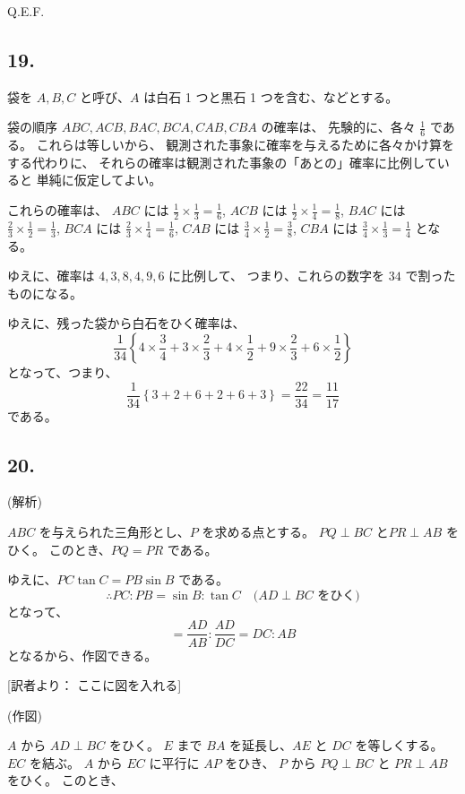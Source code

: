Q.E.F.

\subsection*{19.}

袋を $A, B, C$ と呼び、$A$ は白石 1 つと黒石 1 つを含む、などとする。

袋の順序 $ABC, ACB, BAC, BCA, CAB, CBA$ の確率は、
先験的に、各々 $\frac{1}{6}$ である。
これらは等しいから、
観測された事象に確率を与えるために各々かけ算をする代わりに、
それらの確率は観測された事象の「あとの」確率に比例していると
単純に仮定してよい。

これらの確率は、
$ABC$ には $\frac{1}{2} \times \frac{1}{3} = \frac{1}{6}$,
$ACB$ には $\frac{1}{2} \times \frac{1}{4} = \frac{1}{8}$,
$BAC$ には $\frac{2}{3} \times \frac{1}{2} = \frac{1}{3}$,
$BCA$ には $\frac{2}{3} \times \frac{1}{4} = \frac{1}{6}$,
$CAB$ には $\frac{3}{4} \times \frac{1}{2} = \frac{3}{8}$,
$CBA$ には $\frac{3}{4} \times \frac{1}{3} = \frac{1}{4}$
となる。

ゆえに、確率は $4, 3, 8, 4, 9, 6$ に比例して、
つまり、これらの数字を $34$ で割ったものになる。

ゆえに、残った袋から白石をひく確率は、
\[
\frac{1}{34} \left\{
    4 \times \frac{3}{4}
  + 3 \times \frac{2}{3}
  + 4 \times \frac{1}{2}
  + 9 \times \frac{2}{3}
  + 6 \times \frac{1}{2}
  \right\}
\]
となって、つまり、
\[
\frac{1}{34} \left\{
    3 + 2 + 6 + 2 + 6 + 3
  \right\}
  = \frac{22}{34} = \frac{11}{17}
\]
である。

\subsection*{20.}

(解析)

$ABC$ を与えられた三角形とし、$P$ を求める点とする。
$PQ \perp BC$ と$PR \perp AB$ をひく。
このとき、$PQ = PR$ である。

ゆえに、$PC \tan C = PB \sin B$ である。
\[
\therefore
PC: PB = \sin B : \tan C
\quad \mbox{($AD \perp BC$ をひく)}
\]
となって、
\[
= \frac{AD}{AB} : \frac{AD}{DC}
= DC : AB
\]
となるから、作図できる。

[訳者より： ここに図を入れる]

(作図)

$A$ から $AD \perp BC$ をひく。
$E$ まで $BA$ を延長し、$AE$ と $DC$ を等しくする。
$EC$ を結ぶ。
$A$ から $EC$ に平行に $AP$ をひき、
$P$ から $PQ \perp BC$ と $PR \perp AB$ をひく。
このとき、


